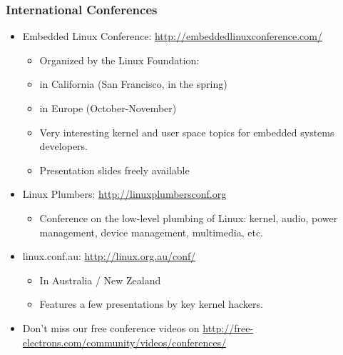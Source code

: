 \begin{frame}
  \frametitle{International Conferences}
  \begin{itemize}
  \item Embedded Linux Conference: \url{http://embeddedlinuxconference.com/}
    \begin{itemize}
    \item Organized by the Linux Foundation:
    \item in California (San Francisco, in the spring)
    \item in Europe (October-November)
    \item Very interesting kernel and user space topics for embedded
      systems developers.
    \item Presentation slides freely available
    \end{itemize}
  \item Linux Plumbers: \url{http://linuxplumbersconf.org}
    \begin{itemize}
    \item Conference on the low-level plumbing of Linux: kernel,
      audio, power management, device management, multimedia, etc.
    \end{itemize}
  \item linux.conf.au: \url{http://linux.org.au/conf/}
    \begin{itemize}
    \item In Australia / New Zealand
    \item Features a few presentations by key kernel hackers.
    \end{itemize}
  \item Don't miss our free conference videos on
    \url{http://free-electrons.com/community/videos/conferences/}
  \end{itemize}
\end{frame}

